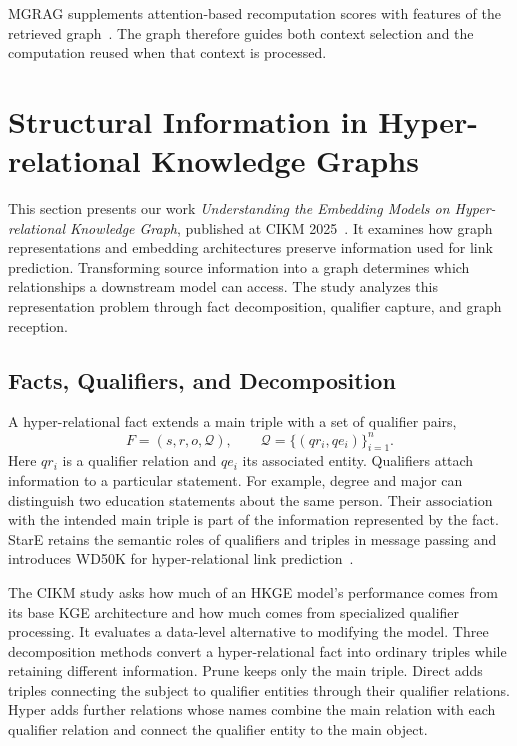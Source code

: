 MGRAG supplements attention-based recomputation scores with features of the retrieved graph~\cite{bg-mgrag}. The graph therefore guides both context selection and the computation reused when that context is processed.

\section{Structural Information in Hyper-relational Knowledge Graphs}
\label{sec:background:hyperkg}

This section presents our work \emph{Understanding the Embedding Models on Hyper-relational Knowledge Graph}, published at CIKM 2025~\cite{bg-hyperkg}. It examines how graph representations and embedding architectures preserve information used for link prediction. Transforming source information into a graph determines which relationships a downstream model can access. The study analyzes this representation problem through fact decomposition, qualifier capture, and graph reception.

\subsection{Facts, Qualifiers, and Decomposition}

A hyper-relational fact extends a main triple with a set of qualifier pairs,
\begin{equation}
F=\left(s,r,o,\mathcal{Q}\right),\qquad
\mathcal{Q}=\{(qr_i,qe_i)\}_{i=1}^{n}.
\label{eq:background:hyper-fact}
\end{equation}
Here $qr_i$ is a qualifier relation and $qe_i$ its associated entity. Qualifiers attach information to a particular statement. For example, degree and major can distinguish two education statements about the same person. Their association with the intended main triple is part of the information represented by the fact. StarE retains the semantic roles of qualifiers and triples in message passing and introduces WD50K for hyper-relational link prediction~\cite{bg-stare}.

The CIKM study asks how much of an HKGE model's performance comes from its base KGE architecture and how much comes from specialized qualifier processing. It evaluates a data-level alternative to modifying the model. Three decomposition methods convert a hyper-relational fact into ordinary triples while retaining different information. Prune keeps only the main triple. Direct adds triples connecting the subject to qualifier entities through their qualifier relations. Hyper adds further relations whose names combine the main relation with each qualifier relation and connect the qualifier entity to the main object.

